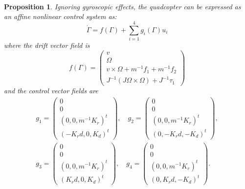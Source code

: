 \documentclass{aims}
\newtheorem{proposition}{Proposition}
\theoremstyle{definition}
\begin{document}
\begin{proposition}\label{prop: control system}
Ignoring gyroscopic effects, the quadcopter can be expressed as an affine nonlinear control system as:
\begin{equation}
\dot{\Gamma}=f(\Gamma) + \sum_{i=1}^4g_i(\Gamma)u_i
\end{equation}
where the drift vector field is 
$$f(\Gamma)= \begin{pmatrix}
    v\\\Omega\\v\times\Omega +m^{-1}f_1+m^{-1}f_2\\J^{-1}(J\Omega\times\Omega)+J^{-1}\tau_1
    \end{pmatrix}
$$
and the control vector fields are 
\begin{eqnarray*}
    g_1=\begin{pmatrix}
    0\\ 0\\ (0, 0,m^{-1}K_r)^t \\ (-K_rd, 0, K_d)^t
    \end{pmatrix}, \quad
    g_2=\begin{pmatrix}
    0\\ 0\\ (0, 0,m^{-1}K_r)^t \\ (0, -K_rd, -K_d)^t
    \end{pmatrix}, \\
    g_3=\begin{pmatrix}
    0\\ 0\\ (0, 0,m^{-1}K_r)^t \\ (K_rd, 0, K_d)^t
    \end{pmatrix}, \quad
    g_4=\begin{pmatrix}
    0\\ 0\\ (0, 0,m^{-1}K_r)^t \\ (0, K_rd, -K_d)^t
    \end{pmatrix}.
\end{eqnarray*}
\end{proposition}
\end{document}
